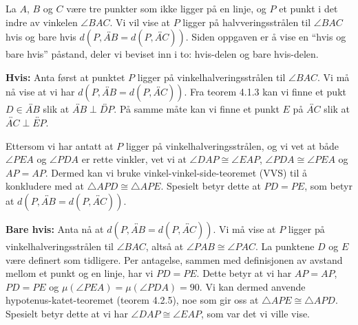 \begin{oppgave}[4.3.8]
    La $A$, $B$ og $C$ være tre punkter som ikke ligger på en linje, og $P$ et punkt i det indre av vinkelen $\angle BAC$. 
    Vi vil vise at $P$ ligger på halvveringsstrålen til $\angle BAC$ hvis og bare hvis $d(P, \overleftrightarrow{AB}=d(P, \overleftrightarrow{AC}))$. 
    Siden oppgaven er å vise en ``hvis og bare hvis'' påstand, deler vi beviset inn i to: hvis-delen og bare hvis-delen. 

    \textbf{Hvis:} 
    Anta først at punktet $P$ ligger på vinkelhalveringsstrålen til $\angle BAC$. 
    Vi må nå vise at vi har $d(P, \overleftrightarrow{AB}=d(P, \overleftrightarrow{AC}))$. 
    Fra teorem 4.1.3 kan vi finne et pukt $D\in \overleftrightarrow{AB}$ slik at $\overleftrightarrow{AB}\perp \overleftrightarrow{DP}$.
    På samme måte kan vi finne et punkt $E$ på $\overleftrightarrow{AC}$ slik at $\overleftrightarrow{AC}\perp \overleftrightarrow{EP}$.

    \begin{figure}[H]
        \centering
        
    \end{figure}

    Ettersom vi har antatt at $P$ ligger på vinkelhalveringsstrålen, og vi vet at både $\angle PEA$ og $\angle PDA$ er rette vinkler, vet vi at $\angle DAP\cong \angle EAP$, $\angle PDA\cong \angle PEA$ og $AP=AP$.
    Dermed kan vi bruke vinkel-vinkel-side-teoremet (VVS) til å konkludere med at $\triangle APD\cong \triangle APE$. 
    Spesielt betyr dette at $PD=PE$, som betyr at $d(P, \overleftrightarrow{AB}=d(P, \overleftrightarrow{AC}))$. 

    \textbf{Bare hvis:} Anta nå at $d(P, \overleftrightarrow{AB}=d(P, \overleftrightarrow{AC}))$. 
    Vi må vise at $P$ ligger på vinkelhalveringsstrålen til $\angle BAC$, altså at $\angle PAB\cong \angle PAC$. 
    La punktene $D$ og $E$ være definert som tidligere. 
    Per antagelse, sammen med definisjonen av avstand mellom et punkt og en linje, har vi $PD=PE$. 
    Dette betyr at vi har $AP=AP$, $PD=PE$ og $\mu(\angle PEA)=\mu(\angle PDA)=90$. 
    Vi kan dermed anvende hypotenus-katet-teoremet (teorem 4.2.5), noe som gir oss at $\triangle APE\cong\triangle APD$. 
    Spesielt betyr dette at vi har $\angle DAP\cong \angle EAP$, som var det vi ville vise. 

\end{oppgave}
